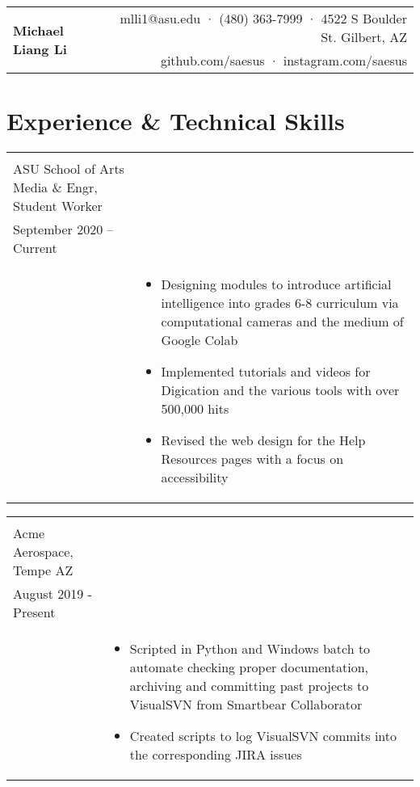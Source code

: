 \documentclass[10pt]{article}
\makeatletter
\newcommand{\headingtitle}[3]{
\begin{tabular*}{7in}{l@{\extracolsep{\fill}}r}
	\multirow{2}{*}{#1}&#2\\
	&#3\\
\end{tabular*}}
\newcommand{\tabu}[2]{
	\begin{tabular}[t]{ l l }
		#1 & #2
	\end{tabular}}
\makeatother
\begin{document}
	
	\headingtitle{\textbf{\huge Michael Liang Li}}{mlli1@asu.edu · (480) 363-7999 · 4522 S Boulder St. Gilbert, AZ}{github.com/saesus · instagram.com/saesus}
	\vspace{-2em}
	
	\section{Experience \& Technical Skills}
		\tabu
		{\begin{minipage}[t]{0.3\linewidth}
				\textbf{ImageSTEM} \\
				ASU School of Arts Media \& Engr, Student Worker\\
				September 2020 – Current\\
		\end{minipage}}
		{\begin{minipage}[t]{.7\linewidth}
				\begin{itemize}[noitemsep, topsep=0pt]
					\item Designing modules to introduce artificial intelligence into grades 6-8 curriculum via computational cameras and the medium of Google Colab
					\item Implemented tutorials and videos for Digication and the various tools with over 500,000 hits
					\item Revised the web design for the Help Resources pages with a focus on accessibility
				\end{itemize}
		\end{minipage}}	
	
		\tabu
		{\begin{minipage}[t]{0.3\linewidth}
				\textbf{Software Intern} \\
				Acme Aerospace, Tempe AZ\\
				August 2019 - Present\\
		\end{minipage}}
		{\begin{minipage}[t]{.7\linewidth}
				\begin{itemize}[noitemsep, topsep=0pt]
					\item Scripted in Python and Windows batch to automate checking proper documentation, archiving and committing past projects to VisualSVN from Smartbear Collaborator
					\item Created scripts to log VisualSVN commits into the corresponding JIRA issues
				\end{itemize}
		\end{minipage}}
	
\end{document}
